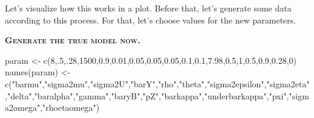 \documentclass[
]{book}
\newenvironment{Shaded}{\begin{snugshade}}{\end{snugshade}}
\newcommand{\DecValTok}[1]{\textcolor[rgb]{0.00,0.00,0.81}{#1}}
\newcommand{\FloatTok}[1]{\textcolor[rgb]{0.00,0.00,0.81}{#1}}
\newcommand{\FunctionTok}[1]{\textcolor[rgb]{0.00,0.00,0.00}{#1}}
\newcommand{\NormalTok}[1]{#1}
\newcommand{\OtherTok}[1]{\textcolor[rgb]{0.56,0.35,0.01}{#1}}
\newcommand{\StringTok}[1]{\textcolor[rgb]{0.31,0.60,0.02}{#1}}
\theoremstyle{definition}
\theoremstyle{definition}
\theoremstyle{definition}
\theoremstyle{definition}
\theoremstyle{remark}
\begin{document}
Let's visualize how this works in a plot.
Before that, let's generate some data according to this process.
For that, let's choose values for the new parameters.

\textbf{\textsc{Generate the true model now.}}

\begin{Shaded}
\begin{Highlighting}[]
\NormalTok{param }\OtherTok{\textless{}{-}} \FunctionTok{c}\NormalTok{(}\DecValTok{8}\NormalTok{,.}\DecValTok{5}\NormalTok{,.}\DecValTok{28}\NormalTok{,}\DecValTok{1500}\NormalTok{,}\FloatTok{0.9}\NormalTok{,}\FloatTok{0.01}\NormalTok{,}\FloatTok{0.05}\NormalTok{,}\FloatTok{0.05}\NormalTok{,}\FloatTok{0.05}\NormalTok{,}\FloatTok{0.1}\NormalTok{,}\FloatTok{0.1}\NormalTok{,}\FloatTok{7.98}\NormalTok{,}\FloatTok{0.5}\NormalTok{,}\DecValTok{1}\NormalTok{,}\FloatTok{0.5}\NormalTok{,}\FloatTok{0.9}\NormalTok{,}\FloatTok{0.28}\NormalTok{,}\DecValTok{0}\NormalTok{)}
\FunctionTok{names}\NormalTok{(param) }\OtherTok{\textless{}{-}} \FunctionTok{c}\NormalTok{(}\StringTok{"barmu"}\NormalTok{,}\StringTok{"sigma2mu"}\NormalTok{,}\StringTok{"sigma2U"}\NormalTok{,}\StringTok{"barY"}\NormalTok{,}\StringTok{"rho"}\NormalTok{,}\StringTok{"theta"}\NormalTok{,}\StringTok{"sigma2epsilon"}\NormalTok{,}\StringTok{"sigma2eta"}\NormalTok{,}\StringTok{"delta"}\NormalTok{,}\StringTok{"baralpha"}\NormalTok{,}\StringTok{"gamma"}\NormalTok{,}\StringTok{"baryB"}\NormalTok{,}\StringTok{"pZ"}\NormalTok{,}\StringTok{"barkappa"}\NormalTok{,}\StringTok{"underbarkappa"}\NormalTok{,}\StringTok{"pxi"}\NormalTok{,}\StringTok{"sigma2omega"}\NormalTok{,}\StringTok{"rhoetaomega"}\NormalTok{)}
\end{Highlighting}
\end{Shaded}
\end{document}
